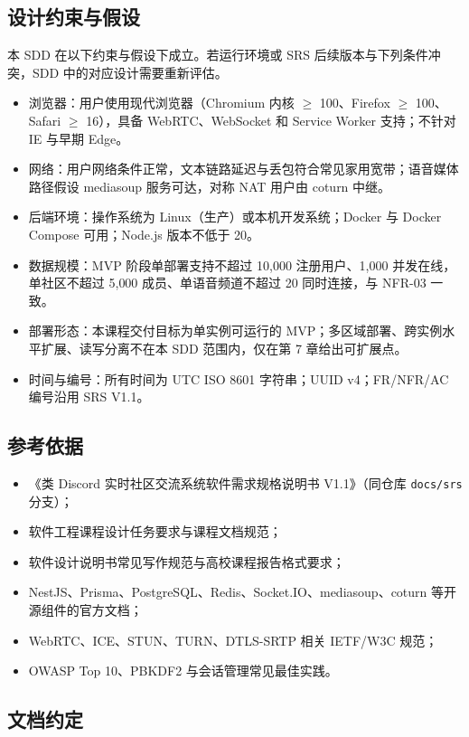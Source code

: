 \subsection{设计约束与假设}

本 SDD 在以下约束与假设下成立。若运行环境或 SRS 后续版本与下列条件冲突，SDD 中的对应设计需要重新评估。

\begin{itemize}
  \item 浏览器：用户使用现代浏览器（Chromium 内核 $\geq$ 100、Firefox $\geq$ 100、Safari $\geq$ 16），具备 WebRTC、WebSocket 和 Service Worker 支持；不针对 IE 与早期 Edge。
  \item 网络：用户网络条件正常，文本链路延迟与丢包符合常见家用宽带；语音媒体路径假设 mediasoup 服务可达，对称 NAT 用户由 coturn 中继。
  \item 后端环境：操作系统为 Linux（生产）或本机开发系统；Docker 与 Docker Compose 可用；Node.js 版本不低于 20。
  \item 数据规模：MVP 阶段单部署支持不超过 10{,}000 注册用户、1{,}000 并发在线，单社区不超过 5{,}000 成员、单语音频道不超过 20 同时连接，与 NFR-03 一致。
  \item 部署形态：本课程交付目标为单实例可运行的 MVP；多区域部署、跨实例水平扩展、读写分离不在本 SDD 范围内，仅在第 7 章给出可扩展点。
  \item 时间与编号：所有时间为 UTC ISO 8601 字符串；UUID v4；FR/NFR/AC 编号沿用 SRS V1.1。
\end{itemize}

\subsection{参考依据}
\begin{itemize}
  \item 《类 Discord 实时社区交流系统软件需求规格说明书 V1.1》（同仓库 \texttt{docs/srs} 分支）；
  \item 软件工程课程设计任务要求与课程文档规范；
  \item 软件设计说明书常见写作规范与高校课程报告格式要求；
  \item NestJS、Prisma、PostgreSQL、Redis、Socket.IO、mediasoup、coturn 等开源组件的官方文档；
  \item WebRTC、ICE、STUN、TURN、DTLS-SRTP 相关 IETF/W3C 规范；
  \item OWASP Top 10、PBKDF2 与会话管理常见最佳实践。
\end{itemize}

\subsection{文档约定}

